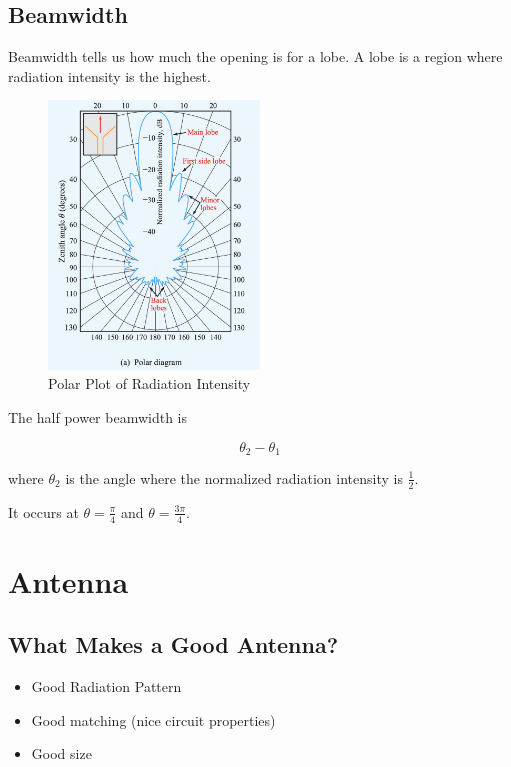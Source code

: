 \documentclass{article} %
\begin{document}
\subsection{Beamwidth}

Beamwidth tells us how much the opening is for a lobe. A lobe is a region where radiation intensity is the highest.

\begin{figure}[H]
    \centering
    \includegraphics[width=0.5\textwidth]{./image/figure3.png}
    \caption{Polar Plot of Radiation Intensity}
\end{figure}

The half power beamwidth is

\[\theta_2 - \theta_1\]

where $\theta_2$ is the angle where the normalized radiation intensity is $\frac{1}{2}$.

It occurs at $\theta = \frac{\pi}{4}$ and $\theta = \frac{3\pi}{4}$.

\section{Antenna }
\subsection{What Makes a Good Antenna?}
\begin{itemize}
    \item Good Radiation Pattern
    \item Good matching (nice circuit properties)
    \item Good size
\end{itemize}
\end{document}
